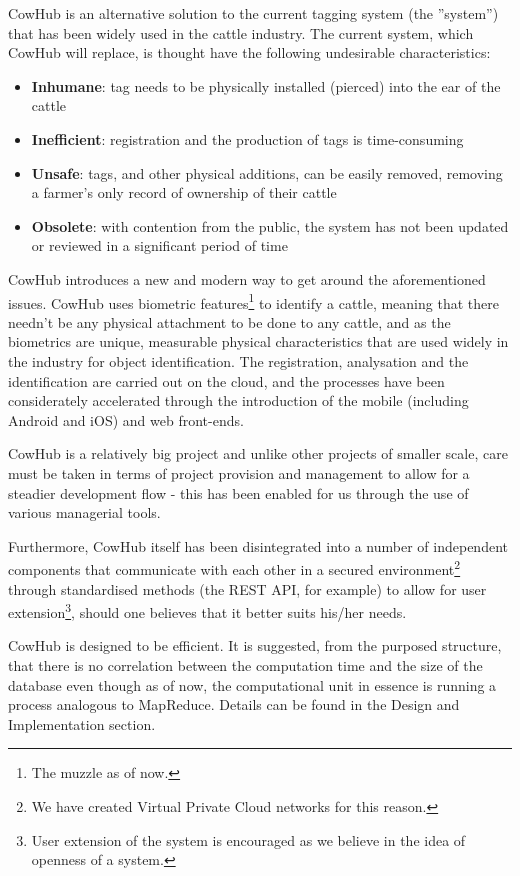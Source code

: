 CowHub is an alternative solution to the current tagging system (the ''system'') that has been widely used in the cattle industry. The current system, which CowHub will replace, is thought have the following undesirable characteristics:

\begin{itemize}
	\item \textbf{Inhumane}: tag needs to be physically installed (pierced) into the ear of the cattle
	\item \textbf{Inefficient}: registration and the production of tags is time-consuming
	\item \textbf{Unsafe}: tags, and other physical additions, can be easily removed, removing a farmer's only record of ownership of their cattle
	\item \textbf{Obsolete}: with contention from the public, the system has not been updated or reviewed in a significant period of time
\end{itemize}

CowHub introduces a new and modern way to get around the aforementioned issues. CowHub uses biometric features\footnote{The muzzle as of now.} to identify a cattle, meaning that there needn't be any physical attachment to be done to any cattle, and as the biometrics are unique, measurable physical characteristics that are used widely in the industry for object identification\cite{biometrics}. The registration, analysation and the identification are carried out on the cloud, and the processes have been considerately accelerated through the introduction of the mobile (including Android and iOS) and web front-ends.

CowHub is a relatively big project and unlike other projects of smaller scale, care must be taken in terms of project provision and management to allow for a steadier development flow - this has been enabled for us through the use of various managerial tools. 

Furthermore, CowHub itself has been disintegrated into a number of independent components that communicate with each other in a secured environment\footnote{We have created Virtual Private Cloud networks for this reason.} through standardised methods (the REST API, for example) to allow for user extension\footnote{User extension of the system is encouraged as we believe in the idea of openness of a system.}, should one believes that it better suits his/her needs.

CowHub is designed to be efficient. It is suggested, from the purposed structure, that there is no correlation between the computation time and the size of the database even though as of now, the computational unit in essence is running a process analogous to MapReduce. Details can be found in the Design and Implementation section.